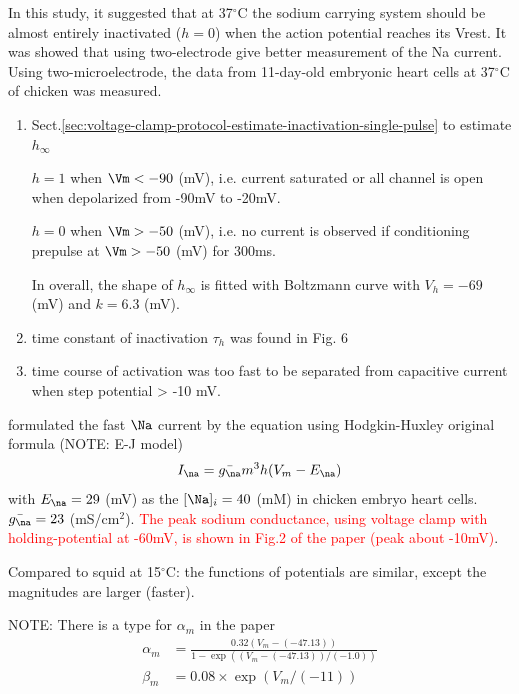 In this study, it suggested that at 37$^\circ$C the sodium carrying system
should be almost entirely inactivated ($h=0$) when the action potential reaches
its   Vrest. It was showed that using two-electrode give better measurement of
the Na current. Using two-microelectrode, the data from 11-day-old embryonic
heart cells at 37$^\circ$C of chicken was measured.
\begin{enumerate}
  \item Sect.\ref{sec:voltage-clamp-protocol-estimate-inactivation-single-pulse}
  to estimate $h_\infty$
  
  $h=1$ when $\Vm < -90$ (mV), i.e. current saturated or all channel is open
  when depolarized from -90mV to -20mV.
  
  $h=0$ when $\Vm > -50$ (mV), i.e. no current is observed if conditioning
  prepulse at $\Vm > -50$ (mV) for 300ms. 
  
  In overall, the shape of $h_\infty$ is fitted with Boltzmann curve with $V_h
  = -69$ (mV) and $k=6.3$ (mV).
  
  \item time constant of inactivation $\tau_h$ was found in Fig. 6
  
  \item time course of activation was too fast to be separated from capacitive
  current when step potential > -10 mV. 
\end{enumerate}

\citep{ebihara1980fsc} formulated the fast $\Na$ current by the equation using
Hodgkin-Huxley original formula (NOTE: E-J model)
\begin{equation}
I_\na = \bar{g_\na} m^3 h (V_m - E_\na)
\end{equation}
with $E_\na = 29$ (mV) as the $[\Na]_i = 40$ (mM) in chicken
embryo heart cells. $\bar{g_\na} = 23$ (mS/cm$^2$).
\textcolor{red}{The peak sodium conductance, using voltage clamp with
holding-potential at -60mV, is shown in Fig.2 of the paper (peak about -10mV)}.

Compared to squid at 15$^\circ$C: the functions of potentials are similar,
except the magnitudes are larger (faster).

NOTE: There is a type for $\alpha_m$ in the paper
\begin{equation}
\begin{split}
\alpha_m &= \frac{0.32 (V_m - (-47.13))}{1 - \exp \left( (V_m - (-47.13))/(-1.0)
\right)}
\\
\beta_m &= 0.08 \times \exp \left( V_m / (-11) \right) 
\end{split}
\end{equation}

